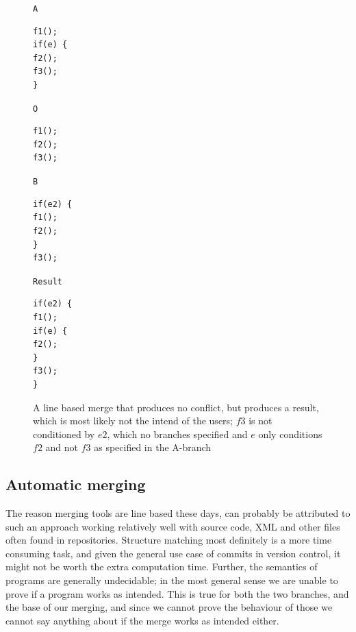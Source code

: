\documentclass[11pt]{article}
\begin{document}
\begin{figure}

\begin{multicols*}{4}

\texttt{A}


\begin{lstlisting}[language=CSharp]
f1();
if(e) {
f2();
f3();
}
\end{lstlisting}

\columnbreak

\texttt{O}

\begin{lstlisting}[language=CSharp]
f1();
f2();
f3();
\end{lstlisting}

\columnbreak

\texttt{B}
 
\begin{lstlisting}[language=CSharp]
if(e2) {
f1();
f2();
}
f3();
\end{lstlisting}

\columnbreak

\texttt{Result}
 
\begin{lstlisting}[language=CSharp]
if(e2) {
f1();
if(e) {
f2();
}
f3();
}

\end{lstlisting}
\end{multicols*}
\caption{A line based merge that produces no conflict, but produces a result, which is most likely not the intend of the users; $f3$ is not conditioned by $e2$, which no branches specified and $e$ only conditions $f2$ and not $f3$ as specified in the A-branch}
\label{WrongMergeFromLineBasedApproach}

\end{figure}


\subsection{Automatic merging}
The reason merging tools are line based these days, can probably be attributed to such an approach working relatively well with source code, XML and other files often found in repositories. Structure matching most definitely is a more time consuming task, and given the general use case of commits in version control, it might not be worth the extra computation time. Further, the semantics of programs are generally undecidable; in the most general sense we are unable to prove if a program works as intended. This is true for both the two branches, and the base of our merging, and since we cannot prove the behaviour of those we cannot say anything about if the merge works as intended either.
\end{document}
